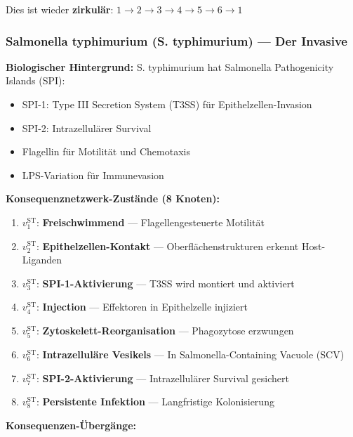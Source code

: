 \documentclass[a4paper,12pt]{article}
\theoremstyle{definition}
\begin{document}
Dies ist wieder \textbf{zirkulär}: $1 \to 2 \to 3 \to 4 \to 5 \to 6 \to 1$


\subsubsection*{Salmonella typhimurium (S. typhimurium) --- Der Invasive}

\textbf{Biologischer Hintergrund:}
S. typhimurium hat Salmonella Pathogenicity Islands (SPI):
\begin{itemize}
    \item SPI-1: Type III Secretion System (T3SS) für Epithelzellen-Invasion
    \item SPI-2: Intrazellulärer Survival
    \item Flagellin für Motilität und Chemotaxis
    \item LPS-Variation für Immunevasion
\end{itemize}

\textbf{Konsequenznetzwerk-Zustände (8 Knoten):}

\begin{enumerate}
    \item $v_1^{\text{ST}}$: \textbf{Freischwimmend} --- Flagellengesteuerte Motilität
    \item $v_2^{\text{ST}}$: \textbf{Epithelzellen-Kontakt} --- Oberflächenstrukturen erkennt Host-Liganden
    \item $v_3^{\text{ST}}$: \textbf{SPI-1-Aktivierung} --- T3SS wird montiert und aktiviert
    \item $v_4^{\text{ST}}$: \textbf{Injection} --- Effektoren in Epithelzelle injiziert
    \item $v_5^{\text{ST}}$: \textbf{Zytoskelett-Reorganisation} --- Phagozytose erzwungen
    \item $v_6^{\text{ST}}$: \textbf{Intrazelluläre Vesikels} --- In Salmonella-Containing Vacuole (SCV)
    \item $v_7^{\text{ST}}$: \textbf{SPI-2-Aktivierung} --- Intrazellulärer Survival gesichert
    \item $v_8^{\text{ST}}$: \textbf{Persistente Infektion} --- Langfristige Kolonisierung
\end{enumerate}

\textbf{Konsequenzen-Übergänge:}
\end{document}

